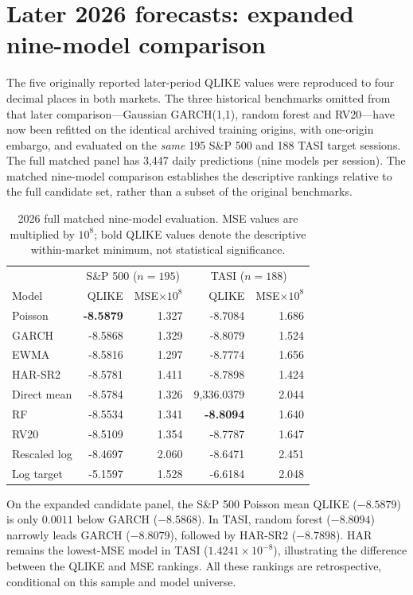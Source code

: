 \section{Later 2026 forecasts: expanded nine-model comparison}
The five originally reported later-period QLIKE values were reproduced to four decimal places in both markets. The three historical benchmarks omitted from that later comparison---Gaussian GARCH(1,1), random forest and RV20---have now been refitted on the identical archived training origins, with one-origin embargo, and evaluated on the \emph{same} 195 S\&P 500 and 188 TASI target sessions. The full matched panel has 3,447 daily predictions (nine models per session). The matched nine-model comparison establishes the descriptive rankings relative to the full candidate set, rather than a subset of the original benchmarks.
\begin{table}[htbp]\centering\small
\caption{2026 full matched nine-model evaluation. MSE values are multiplied by $10^8$; bold QLIKE values denote the descriptive within-market minimum, not statistical significance.}\label{tab:later}
\setlength{\tabcolsep}{5pt}\begin{tabular}{lrrrr}\toprule
 & \multicolumn{2}{c}{S\&P 500 ($n=195$)} & \multicolumn{2}{c}{TASI ($n=188$)} \\
Model & QLIKE & MSE$\times10^8$ & QLIKE & MSE$\times10^8$\\\midrule
Poisson & \textbf{-8.5879} & 1.327 & -8.7084 & 1.686 \\
GARCH & -8.5868 & 1.329 & -8.8079 & 1.524 \\
EWMA & -8.5816 & 1.297 & -8.7774 & 1.656 \\
HAR-SR2 & -8.5781 & 1.411 & -8.7898 & 1.424 \\
Direct mean & -8.5784 & 1.326 & 9,336.0379 & 2.044 \\
RF & -8.5534 & 1.341 & \textbf{-8.8094} & 1.640 \\
RV20 & -8.5109 & 1.354 & -8.7787 & 1.647 \\
Rescaled log & -8.4697 & 2.060 & -8.6471 & 2.451 \\
Log target & -5.1597 & 1.528 & -6.6184 & 2.048 \\
\bottomrule\end{tabular}\end{table}
On the expanded candidate panel, the S\&P 500 Poisson mean QLIKE ($-8.5879$) is only $0.0011$ below GARCH ($-8.5868$). In TASI, random forest ($-8.8094$) narrowly leads GARCH ($-8.8079$), followed by HAR-SR2 ($-8.7898$). HAR remains the lowest-MSE model in TASI ($1.4241\times10^{-8}$), illustrating the difference between the QLIKE and MSE rankings. All these rankings are retrospective, conditional on this sample and model universe.
